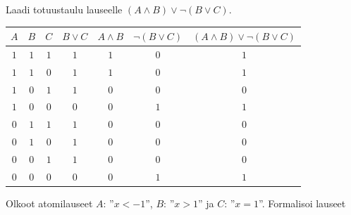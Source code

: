 \begin{tehtavasivu}
\begin{tehtava}
    Laadi totuustaulu lauseelle $(A\land B)\lor \lnot (B\lor C)$.

    \begin{vastaus}
        \begin{center}
		    \begin{tabular}{|c|c|c|c|c|c|c|}\hline
		    $A$ & $B$ & $C$ & $B\lor C$ & $A\land B$ & $\lnot (B\lor C)$ & $(A\land B)\lor \lnot (B\lor C)$\\ \hline
		    $1$ & $1$ & $1$ & $1$ & $1$ & $0$ & $1$  \\ %
		    $1$ & $1$ & $0$ & $1$ & $1$ & $0$ & $1$  \\
		    $1$ & $0$ & $1$ & $1$ & $0$ & $0$ & $0$  \\
		    $1$ & $0$ & $0$ & $0$ & $0$ & $1$ & $1$  \\
		    $0$ & $1$ & $1$ & $1$ & $0$ & $0$ & $0$  \\
		    $0$ & $1$ & $0$ & $1$ & $0$ & $0$ & $0$  \\
		    $0$ & $0$ & $1$ & $1$ & $0$ & $0$ & $0$  \\
		    $0$ & $0$ & $0$ & $0$ & $0$ & $1$ & $1$  \\ \hline
\end{tabular}
\end{center}
    \end{vastaus}
    
\end{tehtava}

\begin{tehtava}
    Olkoot atomilauseet $A$: ''$x < -1$'', $B$: ''$x > 1$''  ja $C$: ''$x = 1$''. Formalisoi  lauseet
    \begin{alakohdat}
    \end{alakohdat}

    \begin{vastaus}
        \begin{alakohdat}
        \end{alakohdat}
    \end{vastaus}
    
\end{tehtava}


\end{tehtavasivu}
